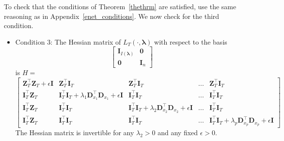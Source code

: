 \documentclass[12pt,letterpaper]{article}
\begin{document}
To check that the conditions of Theorem~\ref{thethrm} are satisfied, use the same reasoning as in Appendix~\ref{enet_conditions}. We now check for the third condition.
\begin{itemize}
\item[] Condition 3: The Hessian matrix of $L_T(\cdot, \boldsymbol{\lambda})$ with respect to the basis 
\begin{equation}
\begin{bmatrix}
\boldsymbol I_{I(\boldsymbol\lambda)} & \boldsymbol 0\\
\boldsymbol 0 & \boldsymbol I_n
\end{bmatrix}
\label{eq:aplmbasis}
\end{equation}
is $H = $
\begin{equation*}
\begin{bmatrix}
\boldsymbol{Z}_T^\top \boldsymbol{Z}_T + \epsilon \boldsymbol I & \boldsymbol Z_T^\top \boldsymbol I_T & \boldsymbol Z_T^\top \boldsymbol I_T & ... & \boldsymbol Z_T^\top \boldsymbol I_T\\
\boldsymbol I_T^\top \boldsymbol Z_T  & \boldsymbol I_T^\top \boldsymbol I_T + \lambda_1 \boldsymbol D_{x_1}^\top \boldsymbol D_{x_1} + \epsilon \boldsymbol I & \boldsymbol I_T^\top \boldsymbol I_T & ... & \boldsymbol I_T^\top \boldsymbol I_T\\
\boldsymbol I_T^\top \boldsymbol Z_T & \boldsymbol I_T^\top \boldsymbol I_T & \boldsymbol I_T^\top \boldsymbol I_T + \lambda_2 \boldsymbol D_{x_2}^\top \boldsymbol D_{x_2} + \epsilon \boldsymbol I & ... & \boldsymbol I_T^\top \boldsymbol I_T\\
\boldsymbol I_T^\top \boldsymbol Z_T & \boldsymbol I_T^\top \boldsymbol I_T & \boldsymbol I_T^\top \boldsymbol I_T & ... & \boldsymbol I_T^\top \boldsymbol I_T + \lambda_p \boldsymbol D_{x_p}^\top \boldsymbol D_{x_p} + \epsilon \boldsymbol I
\end{bmatrix}
\end{equation*}
The Hessian matrix is invertible for any $\lambda_2 > 0$ and any fixed $\epsilon > 0$.
\end{itemize}
\end{document}
